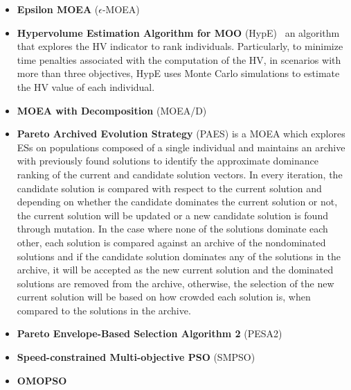 \begin{itemize}
	\item \textbf{Epsilon \ac{MOEA}} ($\epsilon$-MOEA) 
	
	\item \textbf{Hypervolume Estimation Algorithm for \ac{MOO}} (HypE)~\cite{Zitzler2011HypE} an algorithm that explores the \ac{HV} indicator to rank individuals. Particularly, to minimize time penalties associated with the computation of the \ac{HV}, in scenarios with more than three objectives, HypE uses Monte Carlo simulations to estimate the \ac{HV} value of each individual.
	
	\item \textbf{\ac{MOEA} with Decomposition} (MOEA/D)
	
	\item \textbf{Pareto Archived Evolution Strategy} (PAES) is a \ac{MOEA} which explores \acp{ES} on populations composed of a single individual and maintains an archive with previously found solutions to identify the approximate dominance ranking of the current and candidate solution vectors. In every iteration, the candidate solution is compared with respect to the current solution and depending on whether the candidate dominates the current solution or not, the current solution will be updated or a new candidate solution is found through mutation. In the case where none of the solutions dominate each other, each solution is compared against an archive of the nondominated solutions and if the candidate solution dominates any of the solutions in the archive, it will be accepted as the new current solution and the dominated solutions are removed from the archive, otherwise, the selection of the new current solution will be based on how crowded each solution is, when compared to the solutions in the archive. 
		
	\item \textbf{Pareto Envelope-Based Selection Algorithm 2} (PESA2)
	
	\item \textbf{Speed-constrained Multi-objective \ac{PSO}} (SMPSO)
	
	\item \textbf{OMOPSO}
	
\end{itemize}

